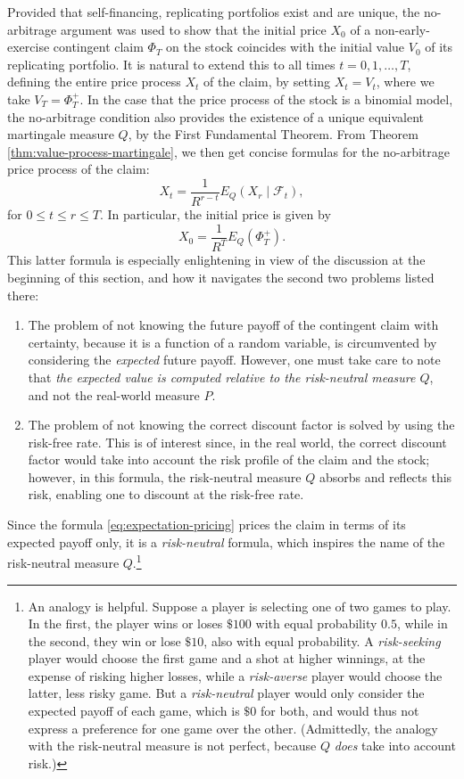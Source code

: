 \documentclass[reqno]{amsart}
\theoremstyle{definition}
\numberwithin{equation}{section}
\begin{document}
Provided that self-financing, replicating portfolios exist and are unique, the no-arbitrage argument was used to show that the initial price $X_0$ of a non-early-exercise contingent claim $\Phi_T$ on the stock coincides with the initial value $V_0$ of its replicating portfolio. It is natural to extend this to all times $t=0,1,\ldots,T$, defining the entire price process $X_t$ of the claim, by setting $X_t=V_t$, where we take $V_T = \Phi_T^+$. In the case that the price process of the stock is a binomial model, the no-arbitrage condition also provides the existence of a unique equivalent martingale measure $Q$, by the First Fundamental Theorem. From Theorem \ref{thm:value-process-martingale}, we then get concise formulas for the no-arbitrage price process of the claim:
	\begin{equation}\label{eq:martingale-pricing}
	X_t = \frac{1}{R^{r-t}} E_Q\left( X_r \mid \mathcal{F}_t\right),
	\end{equation}
for $0 \leq t \leq r \leq T$. In particular, the initial price is given by
	\begin{equation}\label{eq:expectation-pricing}
	X_0 = \frac{1}{R^T} E_Q\left( \Phi_T^+ \right).
	\end{equation}
This latter formula is especially enlightening in view of the discussion at the beginning of this section, and how it navigates the second two problems listed there:
\begin{enumerate}
\item[(2)] The problem of not knowing the future payoff of the contingent claim with certainty, because it is a function of a random variable, is circumvented by considering the \textit{expected} future payoff. However, one must take care to note that \textit{the expected value is computed relative to the risk-neutral measure $Q$}, and not the real-world measure $P$.
\item[(3)] The problem of not knowing the correct discount factor is solved by using the risk-free rate. This is of interest since, in the real world, the correct discount factor would take into account the risk profile of the claim and the stock; however, in this formula, the risk-neutral measure $Q$ absorbs and reflects this risk, enabling one to discount at the risk-free rate.
\end{enumerate}
Since the formula \eqref{eq:expectation-pricing} prices the claim in terms of its expected payoff only, it is a \textit{risk-neutral} formula, which inspires the name of the risk-neutral measure $Q$.\footnote{An analogy is helpful. Suppose a player is selecting one of two games to play. In the first, the player wins or loses $\$100$ with equal probability $0.5$, while in the second, they win or lose $\$10$, also with equal probability. A \textit{risk-seeking} player would choose the first game and a shot at higher winnings, at the expense of risking higher losses, while a \textit{risk-averse} player would choose the latter, less risky game. But a \textit{risk-neutral} player would only consider the expected payoff of each game, which is $\$0$ for both, and would thus not express a preference for one game over the other. (Admittedly, the analogy with the risk-neutral measure is not perfect, because $Q$ \textit{does} take into account risk.)}
\end{document}
